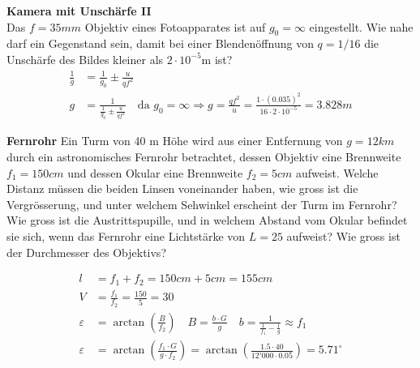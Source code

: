 \textbf{Kamera mit Unschärfe II}\\
Das $f=35mm$ Objektiv eines Fotoapparates ist auf $g_0= \infty$ eingestellt. Wie nahe darf ein Gegenstand sein, damit bei einer Blendenöffnung von $q=1/16$ die Unschärfe des Bildes kleiner als $2\cdot 10^{-5}$m ist?
\begin{align*}
\frac{1}{g} &= \frac{1}{g_0} \pm \frac{u}{qf^2}  \\
g&=\frac{1}{\frac{1}{g_0} \pm \frac{u}{qf^2}} \quad \textrm{da }g_0= \infty \Rightarrow g= \frac{qf^2}{u} = \frac{1\cdot (0.035)^2}{16\cdot 2\cdot 10^{-5}} = 3.828m
\end{align*}

\textbf{Fernrohr}
Ein Turm von 40 m Höhe wird aus einer Entfernung von $g=12km$ durch ein astronomisches Fernrohr betrachtet, dessen Objektiv eine Brennweite $f_1=150cm$ und dessen Okular eine Brennweite $f_2=5 cm$ aufweist. Welche Distanz müssen die beiden Linsen voneinander
haben, wie gross ist die Vergrösserung, und unter welchem Sehwinkel erscheint der Turm im Fernrohr? Wie gross ist die Austrittspupille, und in welchem Abstand vom Okular befindet sie sich, wenn das Fernrohr eine Lichtstärke von $L=25$ aufweist? Wie gross ist der
Durchmesser des Objektivs?

\begin{align*}
l &= f_1+f_2 = 150cm+5cm = 155cm\\
V &= \frac{f_1}{f_2} =\frac{150}{5} = 30\\
\varepsilon&= \arctan\left(\frac{B}{f_2}\right) \quad B = \frac{b\cdot G}{g}\quad b= \frac{1}{\frac{1}{f_1}-\frac{1}{g}} \approx f_1\\ 
\varepsilon&= \arctan\left(\frac{f_1\cdot G}{g\cdot f_2}\right) = \arctan\left(\frac{1.5\cdot 40}{12'000\cdot 0.05}\right) = 5.71^\circ
\end{align*}



